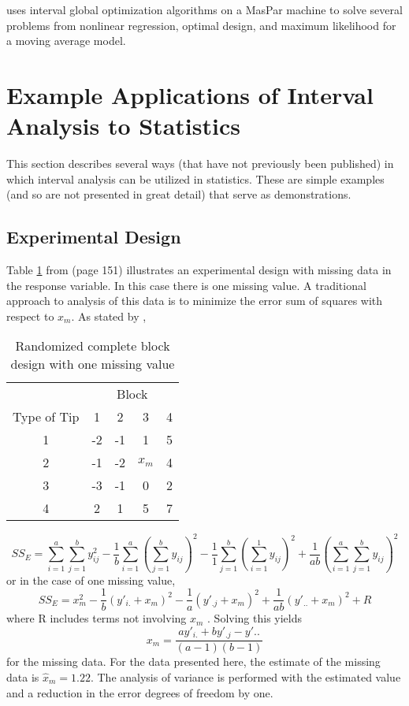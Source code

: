 \cite{WangO94} uses interval global optimization algorithms on a MasPar
machine to solve several problems from nonlinear regression, optimal design,
and maximum likelihood for a moving average model.  

\section{Example Applications of Interval Analysis to Statistics}

This section describes several ways (that have not previously been published)
in which interval analysis can be utilized in statistics. These are simple
examples (and so are not presented in great detail) that serve as
demonstrations.  

\subsection{Experimental Design}

Table \ref{table:rcb} from \cite{Montgomery91} (page 151) 
illustrates an experimental design with 
missing data in the response variable. 
In this case there is one missing value. A traditional approach to analysis of
this data is to minimize the error sum of squares with respect to $x_m$. As
stated by \cite{Montgomery91},

\begin{table}[ht!]
\caption{\label{table:rcb} Randomized complete block design with one missing
  value} 
\begin{center}
\begin{tabular}{|c|cccc|} \hline
 & \multicolumn{4}{|c|}{Block} \\
Type of Tip & 1 & 2 & 3 & 4 \\ \hline
 1 & -2 & -1 & 1 & 5 \\
 2 & -1 & -2 & $x_m$ & 4  \\
 3 & -3 & -1 & 0 & 2 \\
 4 & 2 & 1 & 5 & 7 \\ 
\hline
\end{tabular}
\end{center}
\end{table}

$$
SS_E = \sum_{i=1}^a \sum_{j=1}^b y^2_{ij} - 
  \frac{1}{b} \sum_{i=1}^a\left( \sum_{j=1}^b y_{ij}\right) ^2
  - \frac{1}{1} \sum_{j=1}^b\left( \sum_{i=1}^1 y_{ij}\right) ^2
  + \frac{1}{ab} \left( \sum_{i=1}^a \sum_{j=1}^b y_{ij}\right) ^2
$$
or in the case of one missing value, 
$$
SS_E = x^ 2 _m -\frac{1}{b}(y'_{i.} + x_m)^2 
  -\frac{1}{a}(y'_{.j} + x_m)^2 + \frac{1}{ab}(y'_{..} + x_m)^2+ R
$$
where R includes terms not involving $x_m$ . Solving this yields 
$$
x_m = \frac{ay'_{i.} + by'_{.j}-y'{..}}{(a-1)(b-1)}
$$
for the missing data. For the data presented here, the estimate of the missing data 
is 
$\hat{x}_m = 1.22$. 
The analysis of variance is performed with the estimated value and a 
reduction in the error degrees of freedom by one. 


